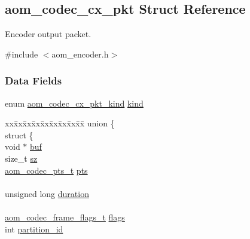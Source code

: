 \hypertarget{structaom__codec__cx__pkt}{}\subsection{aom\+\_\+codec\+\_\+cx\+\_\+pkt Struct Reference}
\label{structaom__codec__cx__pkt}


Encoder output packet.  




{\ttfamily \#include $<$aom\+\_\+encoder.\+h$>$}

\subsubsection*{Data Fields}
\begin{DoxyCompactItemize}
\item 
enum \hyperlink{group__encoder_gafeb69da4a9649a54e805f59c26d8dfed}{aom\+\_\+codec\+\_\+cx\+\_\+pkt\+\_\+kind} \hyperlink{structaom__codec__cx__pkt_a11e586120c689ece9a7690e72ff384be}{kind}
\item 
\begin{tabbing}
xx\=xx\=xx\=xx\=xx\=xx\=xx\=xx\=xx\=\kill
union \{\\
\>struct \{\\
\>\>void $\ast$ \hyperlink{structaom__codec__cx__pkt_ae7f651df762a1f26529a1e9482b6ab7a}{buf}\\
\>\>size\_t \hyperlink{structaom__codec__cx__pkt_a08d19fa7a14be2767d9578f5cca5631e}{sz}\\
\>\>\hyperlink{group__encoder_ga958524226c9a65251c9e4f7bb78fc606}{aom\_codec\_pts\_t} \hyperlink{structaom__codec__cx__pkt_a66df8937a8944bae940a421e34eb0f41}{pts}\\
\>\>\\
\>\>unsigned long \hyperlink{structaom__codec__cx__pkt_a072e5fe84d59d6f7d0fc910b5b608bdf}{duration}\\
\>\>\\
\>\>\hyperlink{group__encoder_gaf776d31e60e32bee1cdbaf052a8ea12a}{aom\_codec\_frame\_flags\_t} \hyperlink{structaom__codec__cx__pkt_a9b064c19b81195c081af90e93879dec0}{flags}\\
\>\>int \hyperlink{structaom__codec__cx__pkt_adfaff3754439ea957ee6957e05c85029}{partition\_id}\\
\>\>\\

\end{tabbing}
\end{DoxyCompactItemize}
